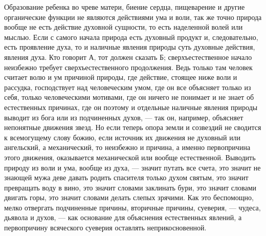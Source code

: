 \documentclass[12pt]{article}
\begin{document}
Образование ребенка во чреве матери, биение сердца, пищеварение и другие органические функции не являются действиями ума и воли, так же точно природа вообще не есть действие духовной сущности, то есть наделенной волей или мыслью. Если с самого начала природа есть духовный продукт и, следовательно, есть проявление духа, то и наличные явления природы суть духовные действия, явления духа. Кто говорит А, тот должен сказать Б; сверхъестественное начало неизбежно требует сверхъестественного продолжения. Ведь только там человек считает волю и ум причиной природы, где действие, стоящее ниже воли и рассудка, господствует над человеческим умом, где он все объясняет только из себя, только человеческими мотивами, где он ничего не понимает и не знает об естественных причинах, где он поэтому и отдельные наличные явления природы выводит из бога или из подчиненных духов, --- так он, например, объясняет непонятные движения звезд. Но если теперь опора земли и созвездий не сводится к всемогущему слову божию, если источник их движения не духовный или ангельский, а механический, то неизбежно и причина, а именно первопричина этого движения, оказывается механической или вообще естественной. Выводить природу из воли и ума, вообще из духа, --- значит путать все счета, это значит не знающей мужа деве давать родить спасителя только духом святым, это значит превращать воду в вино, это значит словами заклинать бури, это значит словами двигать горы, это значит словами делать слепых зрячими. Как это беспомощно, мелко отвергать подчиненные причины, вторичные причины, суеверия, --- чудеса, дьявола и духов, --- как основание для объяснения естественных явлений, а первопричину всяческого суеверия оставлять неприкосновенной.



\section{}
\end{document}

